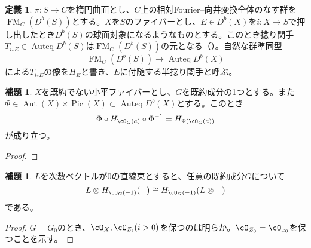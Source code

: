 \documentclass[uplatex, a4paper, dvipdfmx]{jsarticle}
\theoremstyle{definition}
\newtheorem{definition}[theorem]{定義}
\newtheorem{lemma}[theorem]{補題}
\DeclareMathOperator{\Auteq}{\mathrm{Auteq}}
\DeclareMathOperator{\Pic}{\mathrm{Pic}}
\DeclareMathOperator{\Aut}{\mathrm{Aut}}
\DeclareMathOperator{\FM}{\mathrm{FM}}
\begin{document}
\begin{definition}
    $\pi \colon S \to C$を楕円曲面とし、$C$上の相対Fourier--向井変換全体のなす群を$\FM_C(D^b(S))$とする。$X$を$S$のファイバーとし、$E \in D^b(X)$を$i \colon X \to S$で押し出したとき$D^b(S)$の球面対象になるようなものとする。このとき捻り関手$T_{i_*E} \in \Auteq D^b(S)$は$\FM_C(D^b(S))$の元となる（\cite{2023arXiv230212501A}）。自然な群準同型
    \begin{equation}
        \FM_C(D^b(S)) \to \Auteq D^b(X)
    \end{equation}
    による$T_{i_*E}$の像を$H_E$と書き、$E$に付随する半捻り関手と呼ぶ。
\end{definition}
\begin{lemma}\label{lem:conjugate-action}
    $X$を既約でない小平ファイバーとし、$G$を既約成分の1つとする。また$\Phi \in \Aut(X) \ltimes \Pic(X) \subset \Auteq D^b(X)$とする。このとき
    \begin{equation}
        \Phi \circ H_{\cO_G(a)}\circ \Phi^{-1} = H_{\Phi(\cO_G(a))}
    \end{equation}
    が成り立つ。
\end{lemma}
\begin{proof}

\end{proof}
\begin{lemma}
    $L$を次数ベクトルが$0$の直線束とすると、任意の既約成分$G$について
    \begin{equation}
        L\otimes H_{\cO_G(-1)}(-) \cong H_{\cO_G(-1)}(L\otimes -)
    \end{equation}
    である。
\end{lemma}
\begin{proof}
    $G = G_0$のとき、$\cO_{X}, \cO_{Z_i} (i > 0)$を保つのは明らか。$\cO_{Z_0} = \cO_{x_0}$を保つことを示す。
\end{proof}
\end{document}
